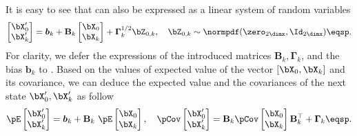 It is easy to see that  can also be expressed as a linear system of random variables
\begin{equation*}
    \begin{bmatrix}\bX_0'\\\bX_k'\end{bmatrix}
    =
    \boldsymbol{b}_k
    + 
    \mathbf{B}_k \begin{bmatrix}\bX_0\\\bX_k\end{bmatrix}
    +
    \mathbf{\Gamma}^{1/2}_k \bZ_{0,k}
    , \quad
    \bZ_{0,k} \sim \normpdf(\zero_{2\dimx}, \Id_{2\dimx})
    \eqsp.
\end{equation*}
For clarity, we defer the expressions of the introduced matrices $\mathbf{B}_k, \mathbf{\Gamma}_k$, and the bias $\boldsymbol{b}_k$ to .
Based on the values of expected value of the vector $[\bX_0, \bX_k]$ and its covariance, we can deduce the expected value and the covariances of the next state $\bX_0', \bX_k'$ as follow
\begin{equation}
    \label{eq:gibbs-kernel-one-rep-gauss}
    \pE\begin{bmatrix}\bX_0'\\\bX_k'\end{bmatrix}
        =
        \boldsymbol{b}_k
        + 
        \mathbf{B}_k \ \pE\begin{bmatrix}\bX_0\\\bX_k\end{bmatrix},
    \quad
    \pCov\begin{bmatrix}\bX_0'\\\bX_k'\end{bmatrix}
        = 
        \mathbf{B}_k \pCov\begin{bmatrix}\bX_0\\\bX_k\end{bmatrix} \mathbf{B}_k^\top + \mathbf{\Gamma}_k
    \eqsp.
\end{equation}
